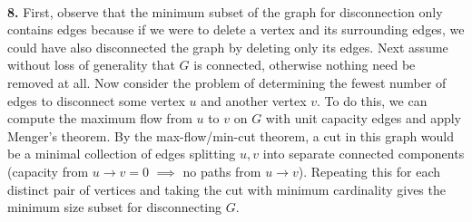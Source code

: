 \documentclass{article}
\begin{document}
\paragraph{} \textbf{8.}
First, observe that the minimum subset of the graph for disconnection only contains edges because if we were to delete a vertex and its surrounding edges, we could have also disconnected the graph by deleting only its edges.  Next assume without loss of generality that $G$ is connected, otherwise nothing need be removed at all.  Now consider the problem of determining the fewest number of edges to disconnect some vertex $u$ and another vertex $v$.  To do this, we can compute the maximum flow from $u$ to $v$ on $G$ with unit capacity edges and apply Menger's theorem.  By the max-flow/min-cut theorem, a cut in this graph would be a minimal collection of edges splitting $u,v$ into separate connected components (capacity from $u \rightarrow v = 0$ $\implies$ no paths from $u \rightarrow v$).  Repeating this for each distinct pair of vertices and taking the cut with minimum cardinality gives the minimum size subset for disconnecting $G$.
\end{document}
